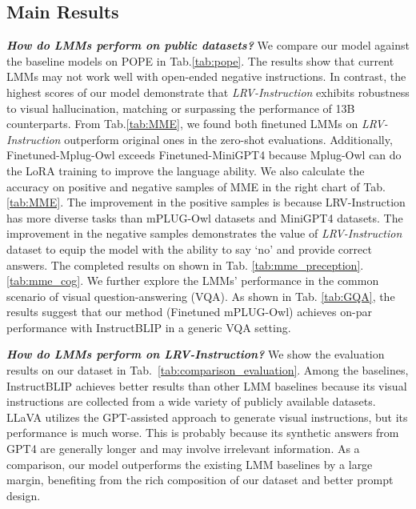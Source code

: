 \vspace{-0.1in}
\subsection{Main Results}

\textbf{\textit{How do LMMs perform on public datasets? }}We compare our model against the baseline models on POPE in Tab.\ref{tab:pope}. The results show that current LMMs may not work well with open-ended negative instructions. In contrast, the highest scores of our model demonstrate that \textit{LRV-Instruction} exhibits robustness to visual hallucination, matching or surpassing the performance of 13B counterparts. From Tab.\ref{tab:MME}, we found both finetuned LMMs on \textit{LRV-Instruction} outperform original ones in the zero-shot evaluations. Additionally, Finetuned-Mplug-Owl exceeds Finetuned-MiniGPT4 because Mplug-Owl can do the LoRA training to improve the language ability. We also calculate the accuracy on positive and negative samples of MME in the right chart of Tab.\ref{tab:MME}. The improvement in the positive samples is because {LRV-Instruction} has more diverse tasks than mPLUG-Owl datasets and MiniGPT4 datasets. The improvement in the negative samples demonstrates the value of \textit{LRV-Instruction} dataset to equip the model with the ability to say ‘no’ and provide correct answers. The completed results on shown in Tab. \ref{tab:mme_preception}.\ref{tab:mme_cog}. We further explore the LMMs' performance in the common scenario of visual question-answering (VQA). As shown in Tab. \ref{tab:GQA}, the results suggest that our method (Finetuned mPLUG-Owl) achieves on-par performance with InstructBLIP in a generic VQA setting.

\textbf{\textit{How do LMMs perform on \textit{LRV-Instruction}? }}We show the evaluation results on our dataset in Tab.~\ref{tab:comparison_evaluation}. Among the baselines, InstructBLIP achieves better results than other LMM baselines because its visual instructions are collected from a wide variety of publicly available datasets. LLaVA \citep{liu2023visual} utilizes the GPT-assisted approach to generate visual instructions, but its performance is much worse. This is probably because its synthetic answers from GPT4 are generally longer and may involve irrelevant information. As a comparison, our model outperforms the existing LMM baselines by a large margin, benefiting from the rich composition of our dataset and better prompt design. 

